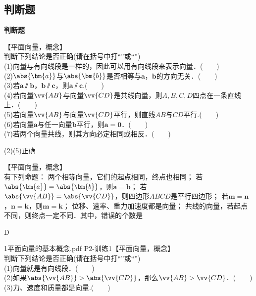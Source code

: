   \subsection{判断题}
  \begin{exercise}{\textbf{判断题}}
    \item 【平面向量，概念】\\
      判断下列结论是否正确(请在括号中打“\checkmark”或“\XSolidBrush”)\\
      (1)向量与有向线段是一样的，因此可以用有向线段来表示向量．(　　)\\
      (2)$\abs{\bm{a}}$与$\abs{\bm{b}}$是否相等与$\bm{a}$，$\bm{b}$的方向无关．(　　)\\
      (3)若$\bm{a}\varparallel\bm{b}$，$\bm{b}\varparallel\bm{c}$，则$\bm{a}\varparallel\bm{c}$.(　　)\\
      (4)若向量$\vv{AB}$与向量$\vv{CD}$是共线向量，则$A,B,C,D$四点在一条直线上．(　　)\\
      (5)若向量$\vv{AB}$与向量$\vv{CD}$平行，则直线$AB$与$CD$平行.(　　)\\
      (6)若向量$\bm a$与任一向量$\bm b$平行，则$\bm a=\bm 0$．(　　)\\
      (7)若两个向量共线，则其方向必定相同或相反．(　　)
      \begin{answer}
        (2)(5)正确
      \end{answer}
    \item 【平面向量，概念】\\
      有下列命题：
      两个相等向量，它们的起点相同，终点也相同；
      若$\abs{\bm{a}}=\abs{\bm{b}}$，则$\bm{a}=\bm{b}$；
      若$\abs{\vv{AB}}=\abs{\vv{CD}}$，则四边形$ABCD$是平行四边形；
      若$\bm{m}=\bm{n}$，$\bm{n}=\bm{k}$，则$\bm{m}=\bm{k}$；
      位移、速率、重力加速度都是向量；
      共线的向量，若起点不同，则终点一定不同．其中，错误的个数是\xz
      \begin{answer}
        D
      \end{answer}
    \item 1平面向量的基本概念.pdf P2-训练1【平面向量，概念】\\
      判断下列结论是否正确(请在括号中打“\checkmark”或“\XSolidBrush”)\\
      (1)向量就是有向线段．(　　)\\
      (2)如果$\abs{\vv{AB}}>\abs{\vv{CD}}$，那么$\vv{AB}>\vv{CD}$．(　　)\\
      (3)力、速度和质量都是向量.(　　)\\

\end{exercise}
